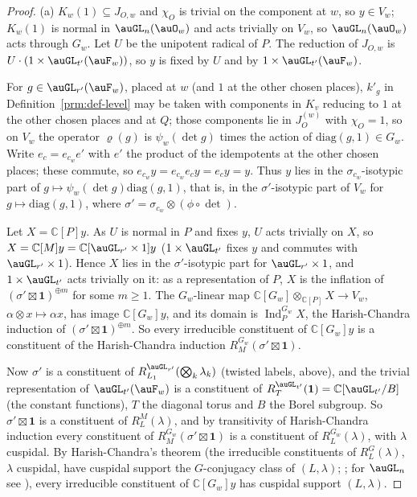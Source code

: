 \documentclass[10pt]{amsart}
\theoremstyle{definition}
\theoremstyle{remark}
\newcommand{\C}{\mathbb C}
\begin{document}
\begin{proof}
(a) $K_w(1)\subseteq J_{O,w}$ and $\chi_O$ is trivial on the component at $w$, so $y\in V_w$; $K_w(1)$
is normal in $\auGL_n(\auO_w)$ and acts trivially on $V_w$, so $\auGL_n(\auO_w)$ acts through
$G_w$. Let $U$ be the unipotent radical of $P$. The reduction of $J_{O,w}$ is $U\cdot(1\times
\auGL_{t'}(\auF_w))$, so $y$ is fixed by $U$ and by $1\times\auGL_{t'}(\auF_w)$.

For $g\in\auGL_{r'}(\auF_w)$, placed at $w$ (and $1$ at the other chosen places), $k'_g$ in
Definition~\ref{prm:def-level} may be taken with components in $K_v$ reducing to $1$ at the other chosen
places and at $Q$; those components lie in $J_O^{(w)}$ with $\chi_O=1$, so on $V_w$ the operator
$\varrho(g)$ is $\psi_w(\det g)$ times the action of $\mathrm{diag}(g,1)\in G_w$. Write $e_c=e_{c_w}e'$
with $e'$ the product of the idempotents at the other chosen places; these commute, so $e_{c_w}y=
e_{c_w}e_cy=e_cy=y$. Thus $y$ lies in the $\sigma_{c_w}$-isotypic part of $g\mapsto\psi_w(\det g)
\mathrm{diag}(g,1)$, that is, in the $\sigma'$-isotypic part of $V_w$ for $g\mapsto\mathrm{diag}(g,1)$,
where $\sigma'=\sigma_{c_w}\otimes(\phi\circ\det)$.

Let $X=\C[P]y$. As $U$ is normal in $P$ and fixes $y$, $U$ acts trivially on $X$, so $X=\C[M]y=\C[
\auGL_{r'}\times1]y$ ($1\times\auGL_{t'}$ fixes $y$ and commutes with $\auGL_{r'}\times1$). Hence $X$ lies
in the $\sigma'$-isotypic part for $\auGL_{r'}\times1$, and $1\times\auGL_{t'}$ acts trivially on it: as
a representation of $P$, $X$ is the inflation of $(\sigma'\boxtimes\mathbf 1)^{\oplus m}$ for some
$m\ge1$. The $G_w$-linear map $\C[G_w]\otimes_{\C[P]}X\to V_w$, $\alpha\otimes x\mapsto\alpha x$, has image
$\C[G_w]y$, and its domain is $\operatorname{Ind}_P^{G_w}X$, the Harish-Chandra induction of
$(\sigma'\boxtimes\mathbf 1)^{\oplus m}$. So every irreducible constituent of $\C[G_w]y$ is a constituent
of the Harish-Chandra induction $R_M^{G_w}(\sigma'\boxtimes\mathbf 1)$.

Now $\sigma'$ is a constituent of $R_{L_1}^{\auGL_{r'}}(\bigotimes_k\lambda_k)$ (twisted labels, above),
and the trivial representation of $\auGL_{t'}(\auF_w)$ is a constituent of $R_{T}^{\auGL_{t'}}(\mathbf 1)
=\C[\auGL_{t'}/B]$ (the constant functions), $T$ the diagonal torus and $B$ the Borel subgroup. So
$\sigma'\boxtimes\mathbf 1$ is a constituent of $R_L^M(\lambda)$, and by transitivity of Harish-Chandra
induction every constituent of $R_M^{G_w}(\sigma'\boxtimes\mathbf 1)$ is a constituent of
$R_L^{G_w}(\lambda)$, with $\lambda$ cuspidal. By Harish-Chandra's theorem (the irreducible constituents
of $R_L^{G}(\lambda)$, $\lambda$ cuspidal, have cuspidal support the $G$-conjugacy class of
$(L,\lambda)$; \cite[Proposition~6.3 and Theorem~6.4]{DigneMichel}; for $\auGL_n$ see \cite[\S2.3, Proposition; \S\S9.2--9.3]{ZelevinskyLNM}), every irreducible constituent of $\C[G_w]y$ has
cuspidal support $(L,\lambda)$.


\end{proof}
\end{document}
